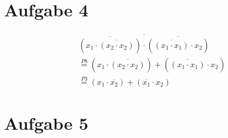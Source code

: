 \documentclass[a4paper]{article}
\begin{document}
\section*{Aufgabe 4}
\begin{equation}
\begin{aligned}
    \overline{\overline{(x_1 \cdot \overline{(x_2 \cdot x_2)})} \cdot \overline{(\overline{(x_1 \cdot x_1)} \cdot x_2)}} \\
    \stackrel{P8}{=} (x_1 \cdot \overline{(x_2 \cdot x_2)}) + (\overline{(x_1 \cdot x_1)} \cdot x_2) \\
    \stackrel{P3}{=} (x_1 \cdot \overline{x_2}) + (\overline{x_1} \cdot x_2)
\end{aligned}
\end{equation}

\clearpage
\section*{Aufgabe 5}
\end{document}
